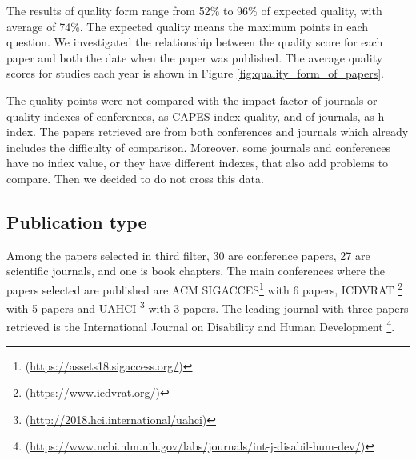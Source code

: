 The results of quality form range from 52\% to 96\% of expected quality, with average of 74\%. The expected quality means the maximum points in each question. We investigated the relationship between the quality score for each paper and both the date when the paper was published. The average quality scores for studies each year is shown in Figure \ref{fig:quality_form_of_papers}.

The quality points were not compared with the impact factor of journals or quality indexes of conferences, as CAPES index quality, and of journals, as h-index. The papers retrieved are from both conferences and journals which already includes the difficulty of comparison. Moreover, some journals and conferences have no index value, or they have different indexes, that also add problems to compare. Then we decided to do not cross this data.

 	\begin{figure}[h] 
   	    \captionsetup{width=16cm}%
	\end{figure}

\subsection{Publication type}
\label{subsec:results-slr-publication}

Among the papers selected in third filter, 30 are conference papers, 27 are scientific journals, and one is book chapters. The main conferences where the papers selected are published are ACM SIGACCES\footnote{ (\url{https://assets18.sigaccess.org/})} with 6 papers, ICDVRAT \footnote{(\url{https://www.icdvrat.org/})} with 5 papers and UAHCI \footnote{(\url{http://2018.hci.international/uahci})} with 3 papers. The leading journal with three papers retrieved is the International Journal on Disability and Human Development \footnote{(\url{https://www.ncbi.nlm.nih.gov/labs/journals/int-j-disabil-hum-dev/})}.

